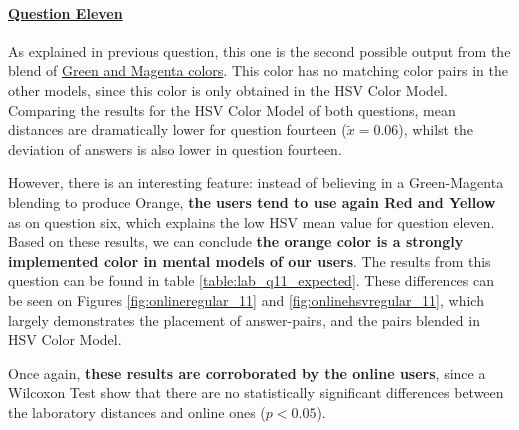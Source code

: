 \paragraph{\ul{Question Eleven}}
%
As explained in previous question, this one is the second possible output from the blend of \ul{Green and Magenta colors}. This color has no matching color pairs in the other models,
since this color is only obtained in the HSV Color Model. Comparing the results for the HSV Color Model of both questions, mean distances are dramatically lower for question fourteen
($\tilde{x} = 0.06$), whilst the deviation of answers is also lower in question fourteen. \par
%
However, there is an interesting feature: instead of believing in a Green-Magenta blending to produce Orange, \textbf{the users tend to use again Red and Yellow} as on question six,
which explains the low HSV mean value for question eleven.
%
Based on these results, we can conclude \textbf{the orange color is a strongly implemented color in mental models of our users}. The results from this question can be found in table
\ref{table:lab_q11_expected}. These differences can be seen on Figures \ref{fig:onlineregular_11} and \ref{fig:onlinehsvregular_11}, which largely demonstrates the placement of
answer-pairs, and the pairs blended in HSV Color Model. \par
%
Once again, \textbf{these results are corroborated by the online users}, since a Wilcoxon Test show that there are no statistically significant differences between the laboratory
distances and online ones ($p < 0.05$).
%
